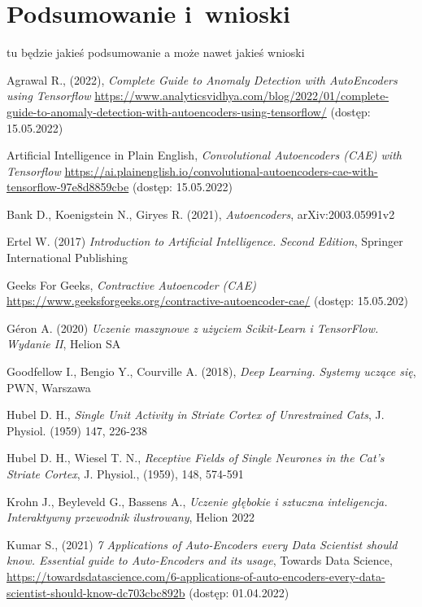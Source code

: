 \documentclass[12pt]{mwbk}
\theoremstyle{plain}
\theoremstyle{definition}
\theoremstyle{remark}
\begin{document}
\chapter*{Podsumowanie i~wnioski}

tu będzie jakieś podsumowanie a może nawet jakieś wnioski

\begin{thebibliography}{99}



 Agrawal R., (2022), \emph{Complete Guide to Anomaly Detection with AutoEncoders using Tensorflow} \url{https://www.analyticsvidhya.com/blog/2022/01/complete-guide-to-anomaly-detection-with-autoencoders-using-tensorflow/} (dostęp: 15.05.2022)

 Artificial Intelligence in Plain English, \emph{Convolutional Autoencoders (CAE) with Tensorflow} \url{https://ai.plainenglish.io/convolutional-autoencoders-cae-with-tensorflow-97e8d8859cbe} (dostęp: 15.05.2022)

 Bank D., Koenigstein N., Giryes R. (2021), \emph{Autoencoders}, arXiv:2003.05991v2




 Ertel W. (2017) \emph{Introduction to Artificial Intelligence. Second Edition}, Springer International Publishing

 Geeks For Geeks, \emph{Contractive Autoencoder (CAE)} \url{https://www.geeksforgeeks.org/contractive-autoencoder-cae/} (dostęp: 15.05.202)

 G\'eron A. (2020) \emph{Uczenie maszynowe z użyciem Scikit-Learn i TensorFlow. Wydanie II}, Helion SA

 Goodfellow I., Bengio Y., Courville A. (2018), \emph{Deep Learning. Systemy uczące się}, PWN, Warszawa 

 Hubel D. H., \emph{Single Unit Activity in  Striate Cortex of Unrestrained Cats}, J. Physiol. (1959) 147, 226-238

 Hubel D. H., Wiesel T. N., \emph{Receptive Fields of Single Neurones in the Cat's Striate Cortex}, J. Physiol., (1959), 148, 574-591




 Krohn J., Beyleveld G., Bassens A., \emph{Uczenie głębokie i sztuczna inteligencja. Interaktywny przewodnik ilustrowany}, Helion 2022

 Kumar S., (2021) \emph{7 Applications of Auto-Encoders every Data Scientist  should know. Essential guide to Auto-Encoders and its usage}, Towards Data Science, \url{https://towardsdatascience.com/6-applications-of-auto-encoders-every-data-scientist-should-know-dc703cbc892b} (dostęp: 01.04.2022)


\end{thebibliography}
\end{document}
